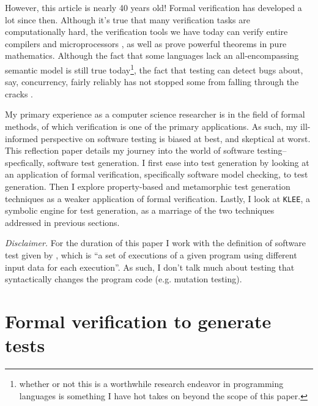 \documentclass[acmsmall,review, nonacm]{acmart}
\begin{document}
However, this article is nearly 40 years old! Formal verification has developed a lot since then. Although it's true that many verification tasks are computationally hard, the verification tools we have today can verify entire compilers \cite{kiam2019cakeml} and microprocessors \cite{hardin2010design}, as well as prove powerful theorems in pure mathematics. Although the fact that some languages lack an all-encompassing semantic model is still true today\footnote{whether or not this is a worthwhile research endeavor in programming languages is something I have hot takes on beyond the scope of this paper.}, the fact that testing can detect bugs about, say, concurrency, fairly reliably has not stopped some from falling through the cracks \cite{gates_2023}.

My primary experience as a computer science researcher is in the field of formal methods, of which verification is one of the primary applications. As such, my ill-informed perspective on software testing is biased at best, and skeptical at worst. This reflection paper details my journey into the world of software testing--specfically, software test generation. I first ease into test generation by looking at an application of formal verification, specifically software model checking, to test generation. Then I explore property-based and metamorphic test generation techniques as a weaker application of formal verification. Lastly, I look at \texttt{KLEE}, a symbolic engine for test generation, as a marriage of the two techniques addressed in previous sections.

\textit{Disclaimer.} For the duration of this paper I work with the definition of software test given by \cite{fink1997property}, which is ``a set of executions of a given program using different input data for each execution''. As such, I don't talk much about testing that syntactically changes the program code (e.g. mutation testing).

\section{Formal verification to generate tests}
\end{document}
